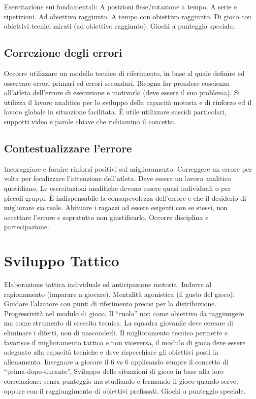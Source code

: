 Esercitazione sui fondamentali:
A posizioni fisse/rotazione a tempo.
A serie e ripetizioni.
Ad obiettivo raggiunto.
A tempo con obiettivo raggiunto.
Di gioco con obiettivi tecnici mirati (ad obiettivo raggiunto).
Giochi a punteggio speciale.

\subsection{Correzione degli errori}
Occorre utilizzare un modello tecnico di riferimento, in base al quale definire ed osservare errori primari ed errori secondari. Bisogna far prendere coscienza all'atleta dell'errore di esecuzione e motivarlo (deve essere il suo problema). Si utilizza il lavoro analitico per lo sviluppo della capacità motoria e di rinforzo ed il lavoro globale in situazione facilitata.
\`E utile utilizzare sussidi particolari, supporti video e parole chiave che richiamino il concetto.

\subsection{Contestualizzare l'errore}
Incoraggiare e fornire rinforzi positivi sul miglioramento. Correggere un errore per volta per focalizzare l'attenzione dell'atleta. Deve essere un lavoro analitico quotidiano.
Le esercitazioni analitiche devono essere quasi individuali o per piccoli gruppi.
\`E indispensabile la consapevolezza dell'errore e che il desiderio di migliorare sia reale.
Abituare i ragazzi ad essere esigenti con se stessi, non accettare l'errore e sopratutto non giustificarlo. Occorre disciplina e partecipazione.

\section{Sviluppo Tattico}
Elaborazione tattica individuale ed anticipazione motoria.
Indurre al ragionamento (imparare a giocare).
Mentalità agonistica (il gusto del gioco).
Guidare l'alzatore con punti di riferimento precisi per la distribuzione.
Progressività nel modulo di gioco.
Il “ruolo” non come obiettivo da raggiungere ma come strumento di crescita tecnica.
La squadra giovanile deve cercare di eliminare i difetti, non di nasconderli.
Il miglioramento tecnico permette e favorisce il miglioramento tattico e non viceversa, il modulo di gioco deve essere adeguato alla capacità tecniche e deve rispecchiare gli obiettivi posti in allenamento.
Insegnare a giocare il 6 vs 6 applicando sempre il concetto di “prima-dopo-durante”.
Sviluppo delle situazioni di gioco in base alla loro correlazione: senza punteggio ma studiando e fermando il gioco quando serve, oppure con il raggiungimento di obiettivi prefissati.
Giochi a punteggio speciale.


